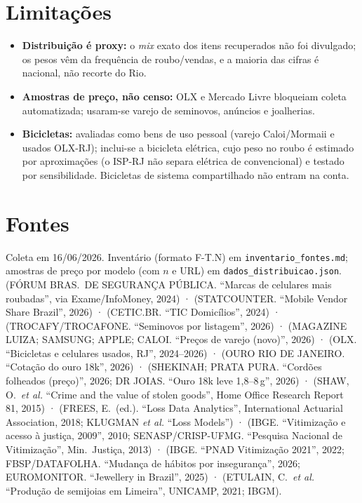 \documentclass[11pt,a4paper]{article}
\begin{document}
\section*{Limitações}
\begin{itemize}\setlength\itemsep{0.1em}
  \item \textbf{Distribuição é proxy:} o \emph{mix} exato dos itens recuperados não foi divulgado;
        os pesos vêm da frequência de roubo/vendas, e a maioria das cifras é nacional, não recorte
        do Rio.
  \item \textbf{Amostras de preço, não censo:} OLX e Mercado Livre bloqueiam coleta automatizada;
        usaram-se varejo de seminovos, anúncios e joalherias.
  \item \textbf{Bicicletas:} avaliadas como bens de uso pessoal (varejo Caloi/Mormaii e usados
        OLX-RJ); inclui-se a bicicleta elétrica, cujo peso no roubo é estimado por aproximações (o
        ISP-RJ não separa elétrica de convencional) e testado por sensibilidade. Bicicletas de
        sistema compartilhado não entram na conta.
\end{itemize}

\section*{Fontes}
\small
\noindent Coleta em 16/06/2026. Inventário (formato F-T.N) em \texttt{inventario\_fontes.md};
amostras de preço por modelo (com $n$ e URL) em \texttt{dados\_distribuicao.json}.
(FÓRUM BRAS.\ DE SEGURANÇA PÚBLICA. ``Marcas de celulares mais roubadas'', via Exame/InfoMoney, 2024) ·
(STATCOUNTER. ``Mobile Vendor Share Brazil'', 2026) ·
(CETIC.BR. ``TIC Domicílios'', 2024) ·
(TROCAFY/TROCAFONE. ``Seminovos por listagem'', 2026) ·
(MAGAZINE LUIZA; SAMSUNG; APPLE; CALOI. ``Preços de varejo (novo)'', 2026) ·
(OLX. ``Bicicletas e celulares usados, RJ'', 2024--2026) ·
(OURO RIO DE JANEIRO. ``Cotação do ouro 18k'', 2026) ·
(SHEKINAH; PRATA PURA. ``Cordões folheados (preço)'', 2026; DR JOIAS. ``Ouro 18k leve 1,8--8\,g'', 2026) ·
(SHAW, O.\ \emph{et al.} ``Crime and the value of stolen goods'', Home Office Research Report 81, 2015) ·
(FREES, E.\ (ed.). ``Loss Data Analytics'', International Actuarial Association, 2018; KLUGMAN \emph{et al.} ``Loss Models'') ·
(IBGE. ``Vitimização e acesso à justiça, 2009'', 2010; SENASP/CRISP-UFMG. ``Pesquisa Nacional de Vitimização'', Min.\ Justiça, 2013) ·
(IBGE. ``PNAD Vitimização 2021'', 2022; FBSP/DATAFOLHA. ``Mudança de hábitos por insegurança'', 2026; EUROMONITOR. ``Jewellery in Brazil'', 2025) ·
(ETULAIN, C.\ \emph{et al.} ``Produção de semijoias em Limeira'', UNICAMP, 2021; IBGM).
\end{document}
